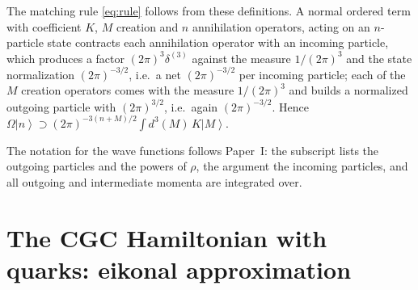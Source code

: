 \documentclass[11pt,a4paper]{article}
\numberwithin{equation}{section}
\newcommand{\ket}[1]{\left|#1\right\rangle}
\newcommand{\OM}{\Omega}
\begin{document}
The matching rule \eqref{eq:rule} follows from these definitions. A normal ordered term with
coefficient $K$, $M$ creation and $n$ annihilation operators, acting on an $n$-particle state
contracts each annihilation operator with an incoming particle, which produces a factor
$(2\pi)^{3}\delta^{(3)}$ against the measure $1/(2\pi)^{3}$ and the state normalization
$(2\pi)^{-3/2}$, i.e.\ a net $(2\pi)^{-3/2}$ per incoming particle; each of the $M$ creation operators
comes with the measure $1/(2\pi)^{3}$ and builds a normalized outgoing particle with
$(2\pi)^{3/2}$, i.e.\ again $(2\pi)^{-3/2}$. Hence $\OM\ket{n}\supset(2\pi)^{-3(n+M)/2}\int d^{3}(M)\,K\ket{M}$.

The notation for the wave functions follows Paper~I: the subscript lists the outgoing particles and
the powers of $\rho$, the argument the incoming particles, and all outgoing and intermediate momenta
are integrated over.

\section{The CGC Hamiltonian with quarks: eikonal approximation}
\label{app:eikonal}
\end{document}
